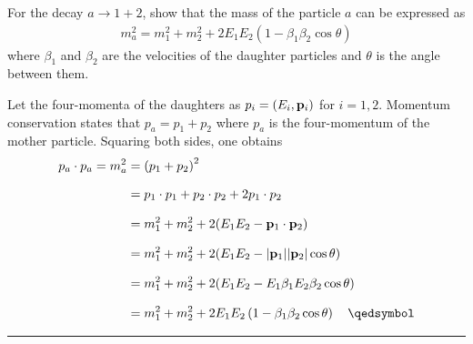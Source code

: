 
\begin{problem}{2.6}\label{p2.6}
   For the decay $a\to1+2$, show that the mass of the particle $a$ can be expressed as 
   \begin{align*}
        m_a^2 = m_1^2+m_2^2 + 2E_1E_2\left( 1 - \beta_1\beta_2 \cos\theta \right)
   \end{align*}
   where $\beta_1$ and $\beta_2$ are the velocities of the daughter particles and $\theta$ is the angle between them.
\end{problem}
    
\begin{solution}
    Let the four-momenta of the daughters as $p_i = \left( E_i,\mathbf{p}_i \right)$ for $i=1,2$. Momentum conservation states that $p_a = p_1 + p_2$ where $p_a$ is the four-momentum of the mother particle.
    Squaring both sides, one obtains 
    \begin{align*}
        p_a \cdot p_a = m_a^2 &= \left( p_1 + p_2 \right)^2 \\[0.1in]
                              &= p_1 \cdot p_1 + p_2 \cdot p_2 + 2 p_1 \cdot p_2 \\[0.1in]
                              &= m_1^2 + m_2^2 + 2 (E_1E_2 - \boldp_1 \cdot \boldp_2) \\[0.1in]
                              &= m_1^2 + m_2^2 + 2 (E_1E_2 - |\boldp_1||\boldp_2|\cos\theta  ) \\[0.1in]
                              &= m_1^2 + m_2^2 + 2 (E_1E_2 - E_1\beta_1E_2\beta_2\cos\theta  ) \\[0.1in]
                              &= m_1^2+m_2^2 + 2E_1E_2\left( 1 - \beta_1\beta_2 \cos\theta \right) \qed 
    \end{align*}
\end{solution} 
    
\noindent\rule{7in}{1.5pt}



